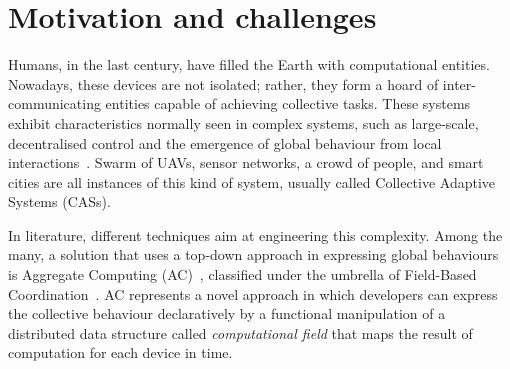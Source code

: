 \documentclass[conference]{IEEEtran}
\begin{document}
\section{Motivation and challenges}
Humans, in the last century, have filled the Earth with computational entities. 
%
%
Nowadays, these devices are not isolated; rather, they form a hoard of inter-communicating entities capable of achieving collective tasks.
% 
These systems exhibit characteristics normally seen in complex systems, such as large-scale, decentralised control and the emergence of global behaviour from local interactions~\cite{DBLP:conf/huc/Ferscha15}.
% 
Swarm of UAVs, sensor networks, a crowd of people, and smart cities are all instances of this kind of system, usually called Collective Adaptive Systems (CASs).

In literature, different techniques aim at engineering this complexity.
%
Among the many, a solution that uses a top-down approach in expressing global behaviours is Aggregate Computing (AC)~\cite{DBLP:journals/computer/BealPV15}, classified under the umbrella of Field-Based Coordination~\cite{DBLP:books/daglib/0015276}.
%
AC represents a novel approach in which developers can express the collective behaviour declaratively by a functional manipulation of a distributed data structure called \emph{computational field} that maps the result of computation for each device in time.
\end{document}
